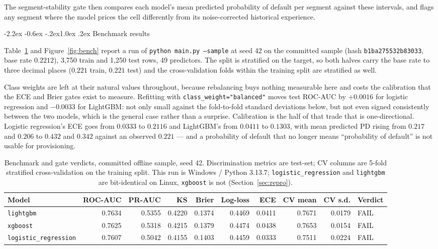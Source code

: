 \documentclass[10pt,a4paper]{article}
\makeatletter
\renewcommand\section{\@startsection{section}{1}{\z@}%
  {-2.2ex \@plus -0.6ex \@minus -.2ex}{1.0ex \@plus .2ex}%
  {\normalfont\large\bfseries}}
\newcommand{\code}[1]{\texttt{\small #1}}
\makeatother
\begin{document}
The segment-stability gate then compares each model's mean predicted probability
of default per segment against these intervals, and flags any segment where the
model prices the cell differently from its noise-corrected historical
experience.

\section{Benchmark results}
\label{sec:bench}

Table~\ref{tab:bench} and Figure~\ref{fig:bench} report a run of
\code{python main.py --sample} at seed 42 on the committed sample (hash
\code{b1ba275532b83033}, base rate $0.2212$), 3{,}750 train and 1{,}250 test
rows, 49 predictors. The split is stratified on the target, so both halves carry
the base rate to three decimal places ($0.221$ train, $0.221$ test) and the
cross-validation folds within the training split are stratified as well.

Class weights are left at their natural values throughout, because rebalancing
buys nothing measurable here and costs the calibration that the ECE and Brier
gates exist to measure. Refitting with \code{class\_weight="balanced"} moves test
ROC-AUC by $+0.0016$ for logistic regression and $-0.0033$ for LightGBM: not only
small against the fold-to-fold standard deviations below, but not even signed
consistently between the two models, which is the general case rather than a
surprise. Calibration is the half of that trade that is one-directional.
Logistic regression's ECE goes from $0.0333$ to $0.2116$ and LightGBM's from
$0.0411$ to $0.1303$, with mean predicted PD rising from $0.217$ and $0.206$ to
$0.432$ and $0.342$ against an observed $0.221$ --- and a probability of default
that no longer means ``probability of default'' is not usable for provisioning.

\begin{table}[htbp]
\centering
\small
\caption{Benchmark and gate verdicts, committed offline sample, seed 42.
Discrimination metrics are test-set; CV columns are 5-fold stratified
cross-validation on the training split. This run is Windows / Python 3.13.7;
\code{logistic\_regression} and \code{lightgbm} are bit-identical on Linux,
\code{xgboost} is not (Section~\ref{sec:repro}).}
\label{tab:bench}
\setlength{\tabcolsep}{4pt}
\begin{tabular}{lrrrrrrrrl}
\toprule
Model & ROC-AUC & PR-AUC & KS & Brier & Log-loss & ECE & CV mean & CV s.d. & Verdict \\
\midrule
\code{lightgbm}            & 0.7634 & 0.5355 & 0.4220 & 0.1374 & 0.4469 & 0.0411 & 0.7671 & 0.0179 & FAIL \\
\code{xgboost}             & 0.7625 & 0.5318 & 0.4215 & 0.1379 & 0.4474 & 0.0438 & 0.7653 & 0.0154 & FAIL \\
\code{logistic\_regression}& 0.7607 & 0.5042 & 0.4155 & 0.1403 & 0.4459 & 0.0333 & 0.7511 & 0.0224 & FAIL \\
\bottomrule
\end{tabular}
\end{table}
\end{document}
